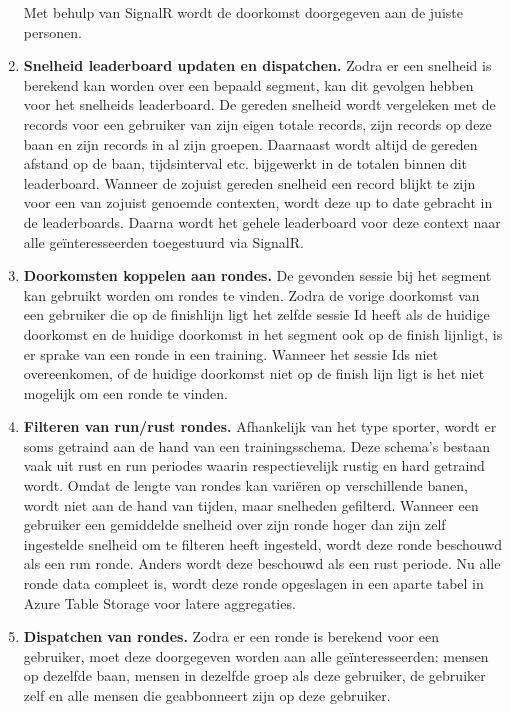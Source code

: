\begin{enumerate}
Met behulp van SignalR wordt de doorkomst doorgegeven aan de juiste personen.

\item \textbf{Snelheid leaderboard updaten en dispatchen.}
Zodra er een snelheid is berekend kan worden over een bepaald segment, kan dit gevolgen hebben voor het snelheids leaderboard. De gereden snelheid wordt vergeleken met de records voor een gebruiker van zijn eigen totale records, zijn records op deze baan en zijn records in al zijn groepen. Daarnaast wordt altijd de gereden afstand op de baan, tijdsinterval etc. bijgewerkt in de totalen binnen dit leaderboard. Wanneer de zojuist gereden snelheid een record blijkt te zijn voor een van zojuist genoemde contexten, wordt deze up to date gebracht in de leaderboards. Daarna wordt het gehele leaderboard voor deze context naar alle geïnteresseerden toegestuurd via SignalR.

\item \textbf{Doorkomsten koppelen aan rondes.}
De gevonden sessie bij het segment kan gebruikt worden om rondes te vinden. Zodra de vorige doorkomst van een gebruiker die op de finishlijn ligt het zelfde sessie Id heeft als de huidige doorkomst en de huidige doorkomst in het segment ook op de finish lijnligt, is er sprake van een ronde in een training. 
Wanneer het sessie Ids niet overeenkomen, of de huidige doorkomst niet op de finish lijn ligt is het niet mogelijk om een ronde te vinden.

\item \textbf{Filteren van run/rust rondes.}
Afhankelijk van het type sporter, wordt er soms getraind aan de hand van een trainingsschema. Deze schema's bestaan vaak uit rust en run periodes waarin respectievelijk rustig en hard getraind wordt. Omdat de lengte van rondes kan variëren op verschillende banen, wordt niet aan de hand van tijden, maar snelheden gefilterd. Wanneer een gebruiker een gemiddelde snelheid over zijn ronde hoger dan zijn zelf ingestelde snelheid om te filteren heeft ingesteld, wordt deze ronde beschouwd als een run ronde. Anders wordt deze beschouwd als een rust periode. Nu alle ronde data compleet is, wordt deze ronde opgeslagen in een aparte tabel in Azure Table Storage voor latere aggregaties.

\item \textbf{Dispatchen van rondes.}
Zodra er een ronde is berekend voor een gebruiker, moet deze doorgegeven worden aan alle geïnteresseerden: mensen op dezelfde baan, mensen in dezelfde groep als deze gebruiker, de gebruiker zelf en alle mensen die geabbonneert zijn op deze gebruiker.


\end{enumerate}
